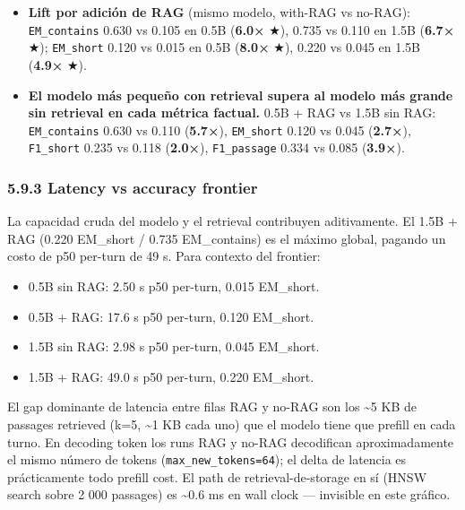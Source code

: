 \begin{itemize}
\tightlist
\item
  \textbf{Lift por adición de RAG} (mismo modelo, with-RAG vs no-RAG):
  \texttt{EM\_contains} 0.630 vs 0.105 en 0.5B (\textbf{6.0×} \(\bigstar\)),
  0.735 vs 0.110 en 1.5B (\textbf{6.7×} \(\bigstar\)); \texttt{EM\_short} 0.120
  vs 0.015 en 0.5B (\textbf{8.0×} \(\bigstar\)), 0.220 vs 0.045 en 1.5B
  (\textbf{4.9×} \(\bigstar\)).
\item
  \textbf{El modelo más pequeño con retrieval supera al modelo más grande sin
  retrieval en cada métrica factual.} 0.5B + RAG vs 1.5B sin RAG:
  \texttt{EM\_contains} 0.630 vs 0.110 (\textbf{5.7×}), \texttt{EM\_short} 0.120
  vs 0.045 (\textbf{2.7×}), \texttt{F1\_short} 0.235 vs 0.118 (\textbf{2.0×}),
  \texttt{F1\_passage} 0.334 vs 0.085 (\textbf{3.9×}).
\end{itemize}

\subsubsection{5.9.3 Latency vs accuracy
frontier}\label{latency-vs-accuracy-frontier}

La capacidad cruda del modelo y el retrieval contribuyen aditivamente. El 1.5B +
RAG (0.220 EM\_short / 0.735 EM\_contains) es el máximo global, pagando un costo
de p50 per-turn de 49 s. Para contexto del frontier:

\begin{itemize}
\tightlist
\item
  0.5B sin RAG: 2.50 s p50 per-turn, 0.015 EM\_short.
\item
  0.5B + RAG: 17.6 s p50 per-turn, 0.120 EM\_short.
\item
  1.5B sin RAG: 2.98 s p50 per-turn, 0.045 EM\_short.
\item
  1.5B + RAG: 49.0 s p50 per-turn, 0.220 EM\_short.
\end{itemize}

El gap dominante de latencia entre filas RAG y no-RAG son los \textasciitilde5
KB de passages retrieved (k=5, \textasciitilde1 KB cada uno) que el modelo tiene
que prefill en cada turno. En decoding token los runs RAG y no-RAG decodifican
aproximadamente el mismo número de tokens (\texttt{max\_new\_tokens=64}); el
delta de latencia es prácticamente todo prefill cost. El path de
retrieval-de-storage en sí (HNSW search sobre 2 000 passages) es
\textasciitilde0.6 ms en wall clock --- invisible en este gráfico.

